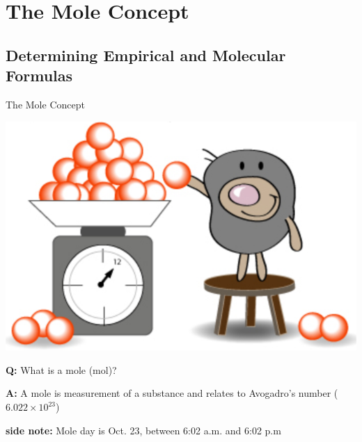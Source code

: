 \documentclass[11pt]{beamer}
\begin{document}
\section{The Mole Concept}

\subsection{Determining Empirical and Molecular Formulas}

\begin{frame}{The Mole Concept}
  \begin{center}
    \includegraphics[scale=0.2]{mole}
  \end{center}
  
  \textbf{Q:} What is a mole (mol)?

  \textbf{A:} A mole is measurement of a substance and relates to
  Avogadro's number ($6.022 \times 10^{23}$)

  \textbf{side note:} Mole day is Oct. 23, between 6:02 a.m. and 6:02 p.m
\end{frame}
\end{document}

